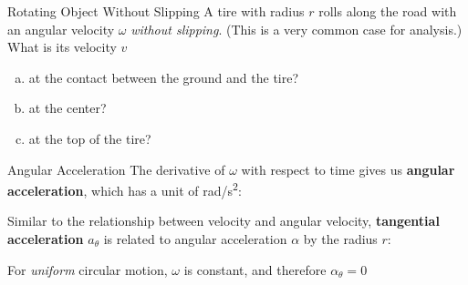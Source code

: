 \documentclass[12pt,compress,aspectratio=169]{beamer}
\newcommand{\eq}[2]{\vspace{#1}{\Large\begin{displaymath}#2\end{displaymath}}}
\begin{document}
\begin{frame}{Rotating Object Without Slipping}
  A tire with radius $r$ rolls along the road with an angular velocity $\omega$
  \emph{without slipping}. (This is a very common case for analysis.)  What
  is its velocity $v$
  \begin{enumerate}[a.]
  \item at the contact between the ground and the tire?
  \item at the center?
  \item at the top of the tire?
  \end{enumerate}

  \vspace{-.4in}
  \begin{center}
    \hspace{1in}
  \end{center}
\end{frame}



\begin{frame}{Angular Acceleration}
  The derivative of $\omega$ with respect to time gives us
  \textbf{angular acceleration}, which has a unit of \si{rad/\second^2}:

  \eq{-.2in}{
    \boxed{\alpha=\dot{\omega}=\ddot{\theta}}
  }

  Similar to the relationship between velocity and angular velocity,
  \textbf{tangential acceleration} $a_\theta$ is related to angular acceleration
  $\alpha$ by the radius $r$:
    
  \eq{-.2in}{
    \boxed{a_\theta(t)=\dot{v}=r\dot{\omega}=r\alpha}
  }
    
  For \emph{uniform} circular motion, $\omega$ is constant, and therefore
  $\alpha_\theta=0$
\end{frame}
\end{document}

